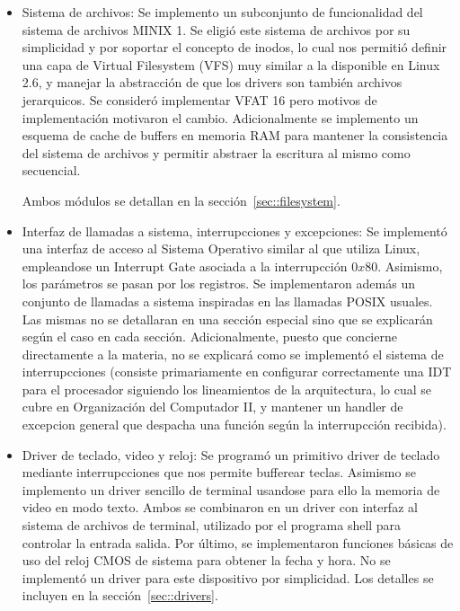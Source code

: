 \begin{itemize}
	\item Sistema de archivos: Se implemento un subconjunto de funcionalidad del sistema de archivos MINIX 1.
	Se eligi\'o este sistema de archivos por su simplicidad y por soportar el concepto de inodos, lo cual nos
	permiti\'o definir una capa de Virtual Filesystem (VFS) muy similar a la disponible en Linux 2.6, y manejar
	la abstracci\'on de que los drivers son tambi\'en archivos jerarquicos. Se consider\'o implementar VFAT 16
	pero motivos de implementaci\'on motivaron el cambio. 
	Adicionalmente se implemento un esquema de cache de buffers en memoria RAM para mantener la consistencia del
	sistema de archivos y permitir abstraer la escritura al mismo como secuencial.

	Ambos m\'odulos se detallan en la secci\'on~\ref{sec::filesystem}.

	\item Interfaz de llamadas a sistema, interrupcciones y excepciones: Se implement\'o una interfaz de acceso
	al Sistema Operativo similar al que utiliza Linux, empleandose un Interrupt Gate asociada a la interrupcci\'on
	$0x80$. Asimismo, los par\'ametros se pasan por los registros. Se implementaron adem\'as un conjunto de llamadas
	a sistema inspiradas en las llamadas POSIX usuales. Las mismas no se detallaran en una secci\'on especial sino que
	se explicar\'an seg\'un el caso en cada secci\'on. Adicionalmente, puesto que concierne directamente a la materia,
	no se explicar\'a como se implement\'o el sistema de interrupcciones (consiste primariamente en configurar correctamente
	una IDT para el procesador siguiendo los lineamientos de la arquitectura, lo cual se cubre en Organizaci\'on del Computador
	II, y mantener un handler de excepcion general que despacha una funci\'on seg\'un la interrupcci\'on recibida).
	
	\item Driver de teclado, video y reloj: Se program\'o un primitivo driver de teclado mediante interrupcciones que
	nos permite bufferear teclas. Asimismo se implemento un driver sencillo de terminal usandose para ello la memoria
	de video en modo texto. Ambos se combinaron en un driver con interfaz al sistema de archivos de terminal, utilizado
	por el programa shell para controlar la entrada salida. Por \'ultimo, se implementaron funciones b\'asicas de uso
	del reloj CMOS de sistema para obtener la fecha y hora. No se implement\'o un driver para este dispositivo por simplicidad.
	Los detalles se incluyen en la secci\'on~\ref{sec::drivers}.


\end{itemize}
